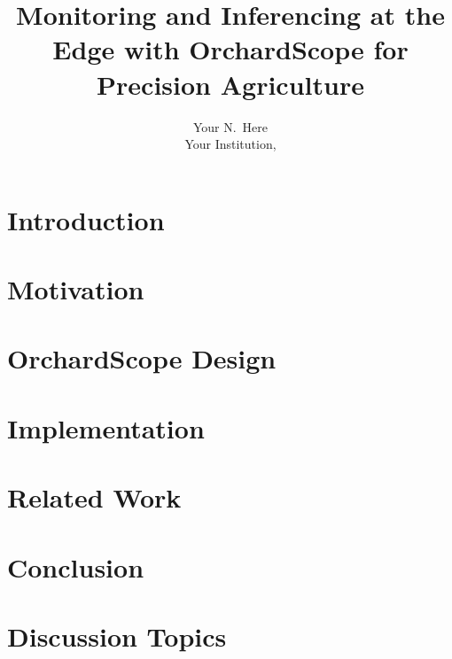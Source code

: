 \documentclass[letterpaper,twocolumn,10pt]{article}
\begin{document}
\title{\Large \bf Monitoring and Inferencing at the Edge with OrchardScope for Precision Agriculture}


\newcommand\fatima[1]{\textcolor{magenta}{Fatima: #1}}
\newcommand\noman[1]{\textcolor{red}{Noman: #1}}

\author{
{\rm Your N.\ Here}\\
Your Institution,
} %




\maketitle

\begin{abstract}

\end{abstract}

\section{Introduction}


\section{Motivation}


\section{OrchardScope Design}

\label{design}

\section{Implementation}

\label{implementation}

\section{Related Work}

\label{related}

\section{Conclusion}

\label{conclusion}

\section{Discussion Topics}

\label{discussion}



\end{document}
